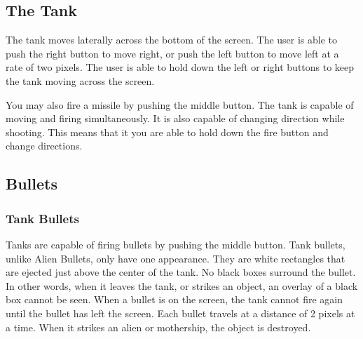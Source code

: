 \documentclass[11pt,letter,oneside]{report}
\begin{document}
\subsection{The Tank}
The tank moves laterally across the bottom of the screen. The user is able to push the right button to move right, or push the left button to move left at a rate of two pixels. The user is able to hold down the left or right buttons to keep the tank moving across the screen.

You may also fire a missile by pushing the middle button. The tank is capable of moving and firing simultaneously. It is also capable of changing direction while shooting. This means that it you are able to hold down the fire button and change directions.

\subsection{Bullets}
\subsubsection{Tank Bullets}
Tanks are capable of firing bullets by pushing the middle button. Tank bullets, unlike Alien Bullets, only have one appearance. They are white rectangles that are ejected just above the center of the tank. No black boxes surround the bullet. In other words, when it leaves the tank, or strikes an object, an overlay of a black box cannot be seen. When a bullet is on the screen, the tank cannot fire again until the bullet has left the screen. Each bullet travels at a distance of 2 pixels at a time. When it strikes an alien or mothership, the object is destroyed.
\end{document}
